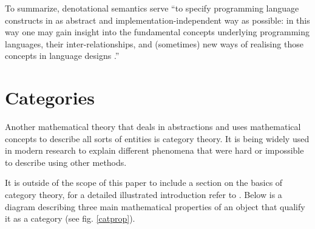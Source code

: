 \documentclass{article}
\begin{document}
To summarize, denotational semantics serve “to specify programming language constructs
in as abstract and implementation-independent way as possible: in this way one may gain insight
into the fundamental concepts underlying programming languages, their inter-relationships, and
(sometimes) new ways of realising those concepts in language designs \cite{Scott}.”

\section*{Categories}

Another mathematical theory that deals in abstractions and uses mathematical concepts to
describe all sorts of entities is category theory. It is being widely used in modern research to
explain different phenomena that were hard or impossible to describe using other methods.

It is outside of the scope of this paper to include a section on the basics of category theory,
for a detailed illustrated introduction refer to \cite{Tsuchiya}. Below is a diagram describing three main
mathematical properties of an object that qualify it as a category (see fig. \ref{catprop}).
\end{document}
